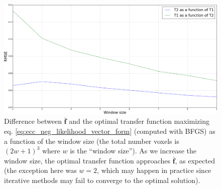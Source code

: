 \begin{figure}[H]
\centering
    \includegraphics[width=1.0\linewidth]{./images/LLR_transfer_rmse.png}
    \caption{{\small Difference between $\mathbf{\bar{f}}$ and the optimal transfer function maximizing eq. \eqref{eq:ecc_neg_likelihood_vector_form} (computed with BFGS) as a function of the window size (the total number voxels is $(2w+1)^{3}$ where $w$ is the ``window size''). As we increase the window size, the optimal transfer function approaches $\mathbf{\bar{f}}$, as expected (the exception here was $w=2$, which may happen in practice since iterative methods may fail to converge to the optimal solution).}}
\label{fig:LLR_transfer_rmse}
\end{figure}



